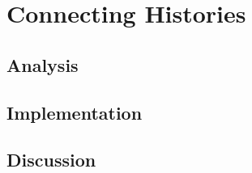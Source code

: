 \chapter{Connecting Histories} %
	\section{Analysis} %
	\section{Implementation} %
	\section{Discussion} %